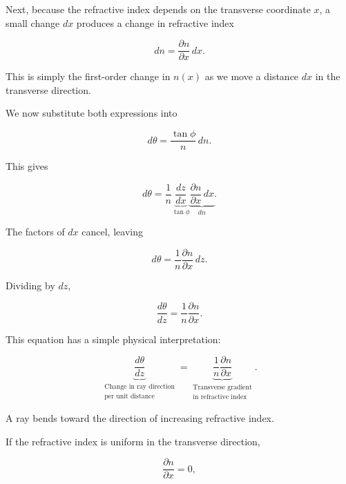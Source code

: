 Next, because the refractive index depends on
the transverse coordinate $x$, a small change
$dx$ produces a change in refractive index

\begin{equation}
\boxed{
dn=\frac{\partial n}{\partial x}\,dx.
}
\end{equation}

This is simply the first-order change in
$n(x)$ as we move a distance $dx$ in the
transverse direction.

We now substitute both expressions into

\begin{equation}
d\theta=\frac{\tan\phi}{n}\,dn.
\end{equation}

This gives

\begin{equation}
d\theta=
\frac{1}{n}
\underbrace{\frac{dz}{dx}}_{\tan\phi}
\underbrace{
\frac{\partial n}{\partial x}\,dx
}_{dn}.
\end{equation}

The factors of $dx$ cancel, leaving

\begin{equation}
\boxed{
d\theta=
\frac{1}{n}
\frac{\partial n}{\partial x}\,dz.
}
\end{equation}

Dividing by $dz$,

\begin{equation}
\boxed{
\frac{d\theta}{dz}
=
\frac{1}{n}\frac{\partial n}{\partial x}.
}
\end{equation}

This equation has a simple physical interpretation:

\begin{equation}
\underbrace{
\frac{d\theta}{dz}
}_{\substack{\text{Change in ray direction}\\
\text{per unit distance}}}
=
\underbrace{
\frac{1}{n}\frac{\partial n}{\partial x}
}_{\substack{\text{Transverse gradient}\\
\text{in refractive index}}}.
\end{equation}

A ray bends toward the direction of increasing
refractive index.

If the refractive index is uniform in the
transverse direction,

\begin{equation}
\frac{\partial n}{\partial x}=0,
\end{equation}

